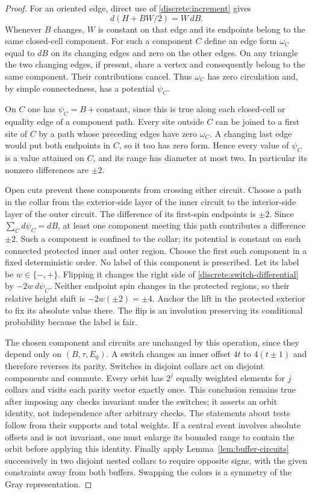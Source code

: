 \begin{proof}
For an oriented edge, direct use of \eqref{discrete:increment} gives
\begin{equation}\label{discrete:switch-differential}
 d(H+BW/2)=W\,dB.
\end{equation}
Whenever $B$ changes, $W$ is constant on that edge and its endpoints
belong to the same closed-cell component. For such a component $C$ define
an edge form $\omega_C$ equal to $dB$ on its changing edges and zero on
the other edges. On any triangle the two changing edges, if present,
share a vertex and consequently belong to the same component. Their
contributions cancel. Thus $\omega_C$ has zero circulation and, by simple
connectedness, has a potential $\psi_C$.

On $C$ one has $\psi_C=B+\text{constant}$, since this is true along each
closed-cell or equality edge of a component path. Every site outside $C$
can be joined to a first site of $C$ by a path whose preceding edges have
zero $\omega_C$. A changing last edge would put both endpoints in $C$,
so it too has zero form. Hence every value of $\psi_C$ is a value attained
on $C$, and its range has diameter at most two. In particular its
nonzero differences are $\pm2$.

Open cuts prevent these components from crossing either circuit. Choose
a path in the collar from the exterior-side layer of the inner circuit
to the interior-side layer of the outer circuit. The difference of its
first-spin endpoints is $\pm2$. Since
$\sum_Cd\psi_C=dB$, at least one component meeting this path contributes
a difference $\pm2$. Such a component is confined to the collar; its
potential is constant on each connected protected inner and outer
region. Choose the first such component in a fixed deterministic order.
No label of this component is prescribed. Let its label be $w\in\{-,+\}$.
Flipping it changes the right side of
\eqref{discrete:switch-differential} by $-2w\,d\psi_C$. Neither endpoint
spin changes in the protected regions, so their relative height shift is
$-2w(\pm2)=\pm4$. Anchor the lift in the protected exterior to fix its
absolute value there. The flip is an involution preserving its
conditional probability because the label is fair.

The chosen component and circuits are unchanged by this operation,
since they depend only on $(B,\tau,E_0)$. A switch changes an inner
offset $4t$ to $4(t\pm1)$ and therefore reverses its parity. Switches in
disjoint collars act on disjoint components and commute. Every orbit
has $2^j$ equally weighted elements for $j$ collars and visits each
parity vector exactly once. This conclusion remains true after imposing
any checks invariant under the switches; it asserts an orbit identity,
not independence after arbitrary checks. The statements about tests
follow from their supports and total weights. If a central event involves
absolute offsets and is not invariant, one must enlarge its bounded
range to contain the orbit before applying this identity. Finally apply
Lemma~\ref{lem:buffer-circuits} successively in two disjoint nested
collars to require opposite signs, with the given constraints away from
both buffers. Swapping the colors is a symmetry of the Gray representation.
\end{proof}

